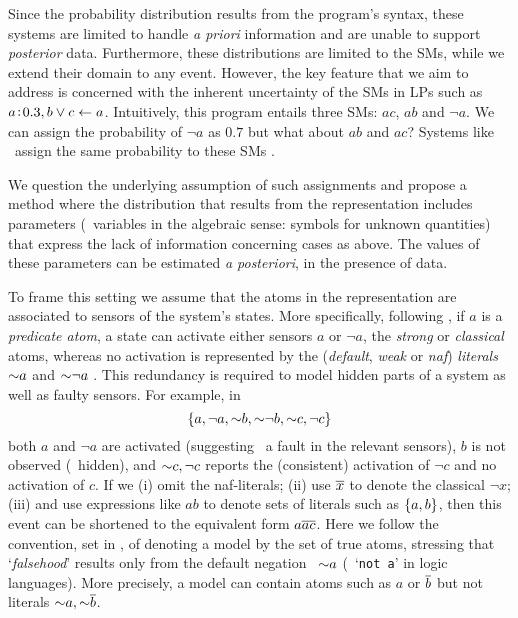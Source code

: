 \documentclass[x11names]{tlp}
\renewcommand{\cite}{\citep}
\begin{document}
Since the probability distribution results from the program's syntax, these systems are limited to handle \emph{a priori} information and are unable to support \emph{posterior} data. Furthermore, these distributions are limited to the \acp{SM}, while we extend their domain to any event. However, the key feature that we aim to address is concerned with the inherent uncertainty of the \acp{SM} in \aclp{LP} such as $a\!:\!0.3, b \vee c \leftarrow a$. Intuitively, this program entails three \acp{SM}: $ac$, $ab$ and $\neg a$. We can assign the probability of $\neg a$ as $0.7$ but what about $ab$ and $ac$? Systems like \lpmln\ assign the same probability to these \acp{SM} \cite{lee2017lpmln,cozman2020joy}.

We question the underlying assumption of such assignments and propose a method where the distribution that results from the representation includes parameters (\ie\ variables in the algebraic sense: symbols for unknown quantities) that express the lack of information concerning cases as above. The values of these parameters can be estimated \emph{a posteriori}, in the presence of data.

To frame this setting  we assume that the atoms in the representation are associated to sensors of the system's states. 
%
More specifically, following \cite{calimeri2020aspcore}, if $a$ is a \emph{predicate atom}, a state can activate either sensors $a$ or $\neg a$, the \emph{strong} or \emph{classical} atoms, whereas no activation is represented by the (\emph{default}, \emph{weak} or \emph{naf}) \emph{literals} $\operatorname{\sim\!} a$ and $\operatorname{\sim\!} \neg a$ .
This redundancy is required to model hidden parts of a system as well as faulty sensors.
%
For example, in
$$
\left\{ a, \neg a, \operatorname{\sim\!} b, \operatorname{\sim\!} \neg b, \operatorname{\sim\!} c, \neg c \right\}
$$
both $a$ and $\neg a$ are activated (suggesting \eg\ a fault in the relevant sensors), $b$ is not observed (\ie\ hidden), and $\operatorname{\sim\!} c, \neg c$ reports the (consistent) activation of $\neg c$ and no activation of $c$.
If we (i) omit the naf-literals; (ii) use $\overline{x}$ to denote the classical $\neg x$; (iii) and use expressions like $ab$ to denote sets of literals such as $\set{a, b}$, then this event can be shortened to the equivalent form $a\overline{a}\overline{c}$.
%
Here we follow the convention, set in \cite{gelfond1988stable}, of denoting a model by the set of true atoms, stressing that `\emph{falsehood}' results only from the default negation \ie\ $\operatorname{\sim\!} a$ (\ie\ `\texttt{not a}' in logic languages).
More precisely, a model can contain atoms such as $a$ or $\overline{b}$ but not literals $\operatorname{\sim\!} a, \operatorname{\sim\!} \overline{b}$. 
\end{document}
